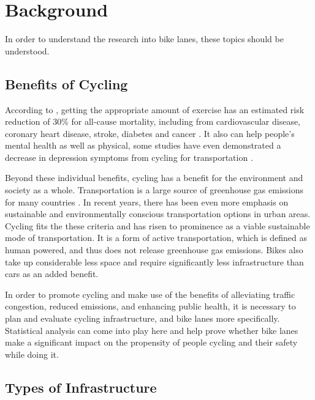 \documentclass[12pt, letterpaper]{article}
\begin{document}
\section{Background}
\label{sec:Background}

In order to understand the research into bike lanes, these topics should be understood. 

\subsection{Benefits of Cycling}
\label{sec:benefit}

According to \citet{Gtschi2015}, getting the appropriate amount of exercise has an estimated risk reduction of 30\% for all-cause mortality, including from cardiovascular disease, coronary heart disease, stroke, diabetes and cancer . It also can help people's mental health as well as physical, some studies have even demonstrated a decrease in depression symptoms from cycling for transportation \cite{Green2021}. \par
Beyond these individual benefits, cycling has a benefit for the environment and society as a whole. Transportation is a large source of greenhouse gas emissions for many countries \cite{Green2021}. In recent years, there has been even more emphasis on sustainable and environmentally conscious transportation options in urban areas. Cycling fits the these criteria and has risen to prominence as a viable sustainable mode of transportation. It is a form of active transportation, which is defined as human powered, and thus does not release greenhouse gas emissions. Bikes also take up considerable less space and require significantly less infrastructure than cars as an added benefit.\par 
In order to promote cycling and make use of the benefits of alleviating traffic congestion, reduced emissions, and enhancing public health, it is necessary to plan and evaluate cycling infrastructure, and bike lanes more specifically. Statistical analysis can come into play here and help prove whether bike lanes make a significant impact on the propensity of people cycling and their safety while doing it. 

\subsection{Types of Infrastructure}
\label{sec:bikeshare}
\end{document}
